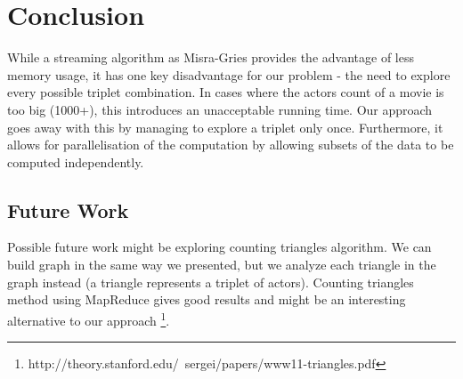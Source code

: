\section{Conclusion}
\label{Conclusion}

While a streaming algorithm as Misra-Gries provides the advantage of less memory usage, it has one key disadvantage for our problem - the need to explore every possible triplet combination. In cases where the actors count of a movie is too big (1000+), this introduces an unacceptable running time. Our approach goes away with this by managing to explore a triplet only once. Furthermore, it allows for parallelisation of the computation by allowing subsets of the data to be computed independently.


\subsection{Future Work}
Possible future work might be exploring counting triangles algorithm. We can build graph in the same way we presented, but we analyze each triangle in the graph instead (a triangle represents a triplet of actors). Counting triangles method using MapReduce gives good results and might be an interesting alternative to our approach \footnote{http://theory.stanford.edu/~sergei/papers/www11-triangles.pdf}.